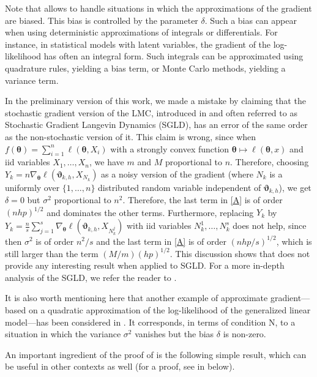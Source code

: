 \documentclass[aoap,preprint,reqno,a4paper]{imsart} %
\newcommand{\btheta}{\boldsymbol{\theta}}
\newcommand{\bvartheta}{\boldsymbol{\vartheta}}
\begin{document}
Note that  allows to handle situations in which the approximations of the
gradient are biased. This bias is controlled by the parameter $\delta$. Such  a bias
can appear when using deterministic approximations of integrals or differentials. For
instance, in statistical models with latent variables, the gradient of the
log-likelihood has often an integral form. Such integrals can be approximated
using quadrature rules, yielding a bias term, or Monte Carlo methods, yielding a
variance term.

In the preliminary version \citep{DalalyanColt} of this work, we made a mistake by
claiming that the stochastic gradient version of the LMC, introduced in \citep{WellingT11}
and often referred to as Stochastic Gradient Langevin Dynamics (SGLD), has an error
of the same order as the non-stochastic version of it. This claim is wrong, since
when $f(\btheta) = \sum_{i=1}^n \ell (\btheta,X_i)$ with a strongly convex function
$\btheta\mapsto \ell(\btheta,x)$ and iid variables $X_1,\ldots,X_n$, we have $m$ and $M$
proportional to $n$. Therefore, choosing $Y_k = n\nabla_{\btheta} \ell (\bvartheta_{k,h},X_{N_k})$
as a noisy version of the gradient (where $N_k$ is a uniformly over $\{1,\ldots,n\}$ distributed
random variable independent of $\bvartheta_{k,h}$), we get $\delta=0$ but $\sigma^2$ proportional
to $n^2$. Therefore, the last term in \eqref{A} is of order $(nhp)^{1/2}$ and dominates the other
terms. Furthermore, replacing $Y_k$ by $Y_k = \frac{n}{s}\sum_{j=1}^s\nabla_{\btheta} \ell (\bvartheta_{k,h},X_{N^j_k})$
with iid variables $N_k^1,\ldots,N_k^s$ does not help, since then $\sigma^2$ is of order $n^2/s$ and
the last term in \eqref{A} is of order $(nhp/s)^{1/2}$, which is still  larger than the term $(M/m)(hp)^{1/2}$.
This discussion shows that  does not provide any interesting result when applied to SGLD.
For a more in-depth analysis of the SGLD, we refer the reader to \citep{Nagapetyan, raginsky17a, Xu}.

It is also worth mentioning here that another example of approximate gradient---based on a quadratic
approximation of the log-likelihood of the generalized linear model---has been considered in
\citep[Section 5]{huggins17a}. It corresponds, in terms of condition N, to a situation in which
the variance $\sigma^2$ vanishes but the bias $\delta$ is non-zero.


An important ingredient of the proof of  is the following simple result, which
can be useful in other contexts as well (for a proof, see  in  below).
\end{document}
